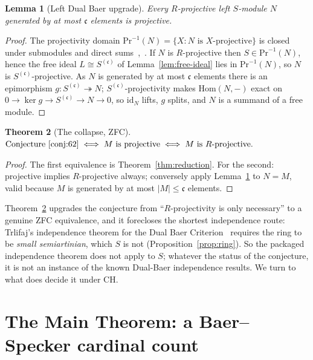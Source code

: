\documentclass[11pt,reqno]{amsart}
\theoremstyle{plain}
\newtheorem{theorem}{Theorem}[section]
\newtheorem{lemma}[theorem]{Lemma}
\theoremstyle{definition}
\theoremstyle{remark}
\newcommand{\Hom}{\mathrm{Hom}}
\begin{document}
\begin{lemma}[Left Dual Baer upgrade]\label{lem:dbc-upgrade}
Every $R$-projective left $S$-module $N$ generated by at most $\mathfrak c$ elements is projective.
\end{lemma}

\begin{proof}
The projectivity domain $\mathrm{Pr}^{-1}(N)=\{X:N\text{ is }X\text{-projective}\}$ is closed under submodules and direct sums~\cite[16.12]{anderson-fuller},~\cite[Lem.~2.2]{trlifaj-dbc}. If $N$ is $R$-projective then $S\in\mathrm{Pr}^{-1}(N)$, hence the free ideal $L\cong S^{(\mathfrak c)}$ of Lemma~\ref{lem:free-ideal} lies in $\mathrm{Pr}^{-1}(N)$, so $N$ is $S^{(\mathfrak c)}$-projective. As $N$ is generated by at most $\mathfrak c$ elements there is an epimorphism $g\colon S^{(\mathfrak c)}\twoheadrightarrow N$; $S^{(\mathfrak c)}$-projectivity makes $\Hom(N,-)$ exact on $0\to\ker g\to S^{(\mathfrak c)}\to N\to 0$, so $\mathrm{id}_N$ lifts, $g$ splits, and $N$ is a summand of a free module.
\end{proof}

\begin{theorem}[The collapse, ZFC]\label{thm:I}
$\text{Conjecture~\ref{conj:62}}\iff M\text{ is projective}\iff M\text{ is }R\text{-projective}.$
\end{theorem}

\begin{proof}
The first equivalence is Theorem~\ref{thm:reduction}. For the second: projective implies $R$-projective always; conversely apply Lemma~\ref{lem:dbc-upgrade} to $N=M$, valid because $M$ is generated by at most $|M|\le\mathfrak c$ elements.
\end{proof}

Theorem~\ref{thm:I} upgrades the conjecture from ``$R$-projectivity is only necessary'' to a genuine ZFC equivalence, and it forecloses the shortest independence route: Trlifaj's independence theorem for the Dual Baer Criterion~\cite[Thm.~4.4]{trlifaj-dbc} requires the ring to be \emph{small semiartinian}, which $S$ is not (Proposition~\ref{prop:ring}). So the packaged independence theorem does not apply to $S$; whatever the status of the conjecture, it is not an instance of the known Dual-Baer independence results. We turn to what does decide it under CH.

\section{The Main Theorem: a Baer--Specker cardinal count}\label{sec:main}
\end{document}
